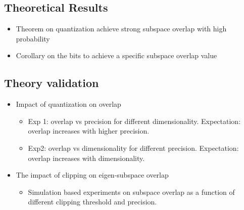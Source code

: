 	
\subsection{Theoretical Results}
	\begin{itemize}
		\item Theorem on quantization achieve strong subspace overlap with high probability
		\item Corollary on the bits to achieve a specific subspace overlap value
	\end{itemize}
	
\subsection{Theory validation}
	\begin{itemize}
		\item Impact of quantization on overlap 
			\begin{itemize}
 				\item Exp 1: overlap vs precision for different dimensionality. Expectation: overlap increases with higher precision.
				\item {} Exp2: overlap vs dimensionality for different precision. Expectation: overlap increases with dimensionality.
			\end{itemize}
		\item The impact of clipping on eigen-subspace overlap
			\begin{itemize}
				\item Simulation based experiments on subspace overlap as a function of different clipping threshold and precision. 
			\end{itemize}
	\end{itemize}

